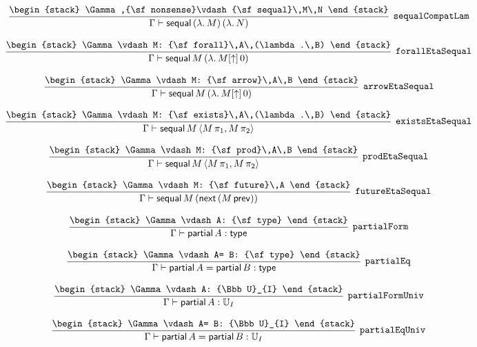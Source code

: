\[
\infer[{\tt sequalCompatLam}]{\Gamma \vdash {\sf sequal}\,(\lambda .\,M)\,(\lambda .\,N)}{
\begin{stack}
\Gamma ,{\sf nonsense}\vdash {\sf sequal}\,M\,N
\end{stack}}
\]

\[
\infer[{\tt forallEtaSequal}]{\Gamma \vdash {\sf sequal}\,M\,(\lambda .\,M[\uparrow ]\,0)}{
\begin{stack}
\Gamma \vdash M: {\sf forall}\,A\,(\lambda .\,B)
\end{stack}}
\]

\[
\infer[{\tt arrowEtaSequal}]{\Gamma \vdash {\sf sequal}\,M\,(\lambda .\,M[\uparrow ]\,0)}{
\begin{stack}
\Gamma \vdash M: {\sf arrow}\,A\,B
\end{stack}}
\]

\[
\infer[{\tt existsEtaSequal}]{\Gamma \vdash {\sf sequal}\,M\,\langle M\, \pi_1,M\, \pi_2\rangle }{
\begin{stack}
\Gamma \vdash M: {\sf exists}\,A\,(\lambda .\,B)
\end{stack}}
\]

\[
\infer[{\tt prodEtaSequal}]{\Gamma \vdash {\sf sequal}\,M\,\langle M\, \pi_1,M\, \pi_2\rangle }{
\begin{stack}
\Gamma \vdash M: {\sf prod}\,A\,B
\end{stack}}
\]

\[
\infer[{\tt futureEtaSequal}]{\Gamma \vdash {\sf sequal}\,M\,({\sf next}\,(M\, {\sf prev}))}{
\begin{stack}
\Gamma \vdash M: {\sf future}\,A
\end{stack}}
\]

\[
\infer[{\tt partialForm}]{\Gamma \vdash {\sf partial}\,A: {\sf type}}{
\begin{stack}
\Gamma \vdash A: {\sf type}
\end{stack}}
\]

\[
\infer[{\tt partialEq}]{\Gamma \vdash {\sf partial}\,A= {\sf partial}\,B: {\sf type}}{
\begin{stack}
\Gamma \vdash A= B: {\sf type}
\end{stack}}
\]

\[
\infer[{\tt partialFormUniv}]{\Gamma \vdash {\sf partial}\,A: {\Bbb U}_{I}}{
\begin{stack}
\Gamma \vdash A: {\Bbb U}_{I}
\end{stack}}
\]

\[
\infer[{\tt partialEqUniv}]{\Gamma \vdash {\sf partial}\,A= {\sf partial}\,B: {\Bbb U}_{I}}{
\begin{stack}
\Gamma \vdash A= B: {\Bbb U}_{I}
\end{stack}}
\]

